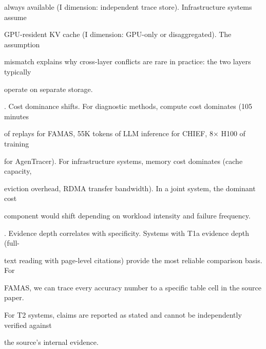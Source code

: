 \begin{flushleft}
\noindent  always available (I dimension: independent trace store). Infrastructure systems assume\par
\noindent  GPU-resident KV cache (I dimension: GPU-only or disaggregated). The assumption\par
\noindent  mismatch explains why cross-layer conflicts are rare in practice: the two layers typically\par
\noindent  operate on separate storage.\par
{}. Cost dominance shifts. For diagnostic methods, compute cost dominates (105 minutes\par
\noindent  of replays for FAMAS, 55K tokens of LLM inference for CHIEF, 8× H100 of training\par
\noindent  for AgenTracer). For infrastructure systems, memory cost dominates (cache capacity,\par
\noindent  eviction overhead, RDMA transfer bandwidth). In a joint system, the dominant cost\par
\noindent  component would shift depending on workload intensity and failure frequency.\par
{}. Evidence depth correlates with specificity. Systems with T1a evidence depth (full-\par
\noindent  text reading with page-level citations) provide the most reliable comparison basis. For\par
\noindent  FAMAS, we can trace every accuracy number to a specific table cell in the source paper.\par
\noindent  For T2 systems, claims are reported as stated and cannot be independently verified against\par
\noindent  the source’s internal evidence.\par
\end{flushleft}
